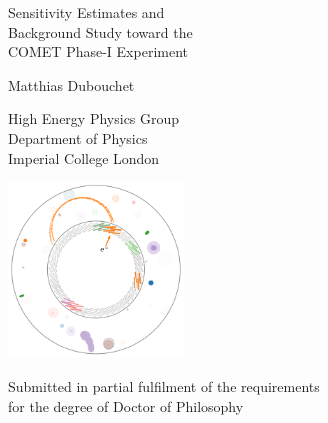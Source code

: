 \documentclass[12pt, a4paper, twoside]{report}
\begin{document}
\thispagestyle{empty}


\vspace*{\fill}

\begin{center}
    
    {\huge Sensitivity Estimates and\\[-0.2cm]
    Background Study toward the \\[-0.2cm]
    COMET Phase-I Experiment \par }%

    \vspace{1cm}
    
    {\Large Matthias Dubouchet}

    \vspace{0.8cm}
    
{\large
High Energy Physics Group\\[-0.2cm]
Department of Physics\\[-0.2cm]
Imperial College London \par
}


    \vspace{1.5cm}
    \includegraphics[width=0.35\textwidth]{title_page_graphic.png}
    \vspace{1cm}
    
    {\large Submitted in partial fulfilment of the requirements\\for the degree
    of Doctor of Philosophy}
    
\end{center}

\vspace*{\fill}
\clearpage

\shipout\null








\tableofcontents
\printglossary[type=\acronymtype]
\cleardoublepage












\clearpage
\appendix


\printbibliography

\listoffigures
\listoftables
\end{document}
